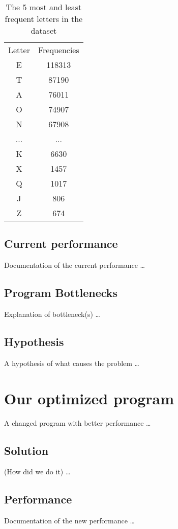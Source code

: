 \documentclass[english]{article}
\begin{document}
\begin{table}[h]
    \centering
    \begin{tabular}{cc}
    Letter & Frequencies \\
    E      & 118313      \\
    T      & 87190       \\
    A      & 76011       \\
    O      & 74907       \\
    N      & 67908       \\
    ...    & ...         \\
    K      & 6630        \\
    X      & 1457        \\
    Q      & 1017        \\
    J      & 806         \\
    Z      & 674        
    \end{tabular}
    \caption{The 5 most and least frequent letters in the dataset}
\end{table}


\subsection{Current performance}
Documentation of the current performance \dots

\subsection{Program Bottlenecks}
Explanation of bottleneck(s) \dots

\subsection{Hypothesis}
A hypothesis of what causes the problem \dots


\section{Our optimized program}
A changed program with better performance \dots

\subsection{Solution}
(How did we do it) \dots

\subsection{Performance}
Documentation of the new performance \dots
\end{document}
